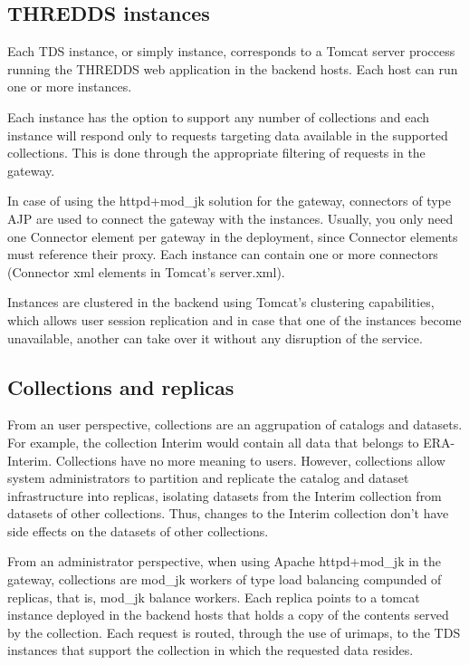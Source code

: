 \documentclass[a4paper,12pt]{article}
\begin{document}
\subsection{THREDDS instances}

Each TDS instance, or simply instance, corresponds to a Tomcat server proccess running the THREDDS web application in the backend hosts. Each host can run one or more instances. 

Each instance has the option to support any number of collections and each instance will respond only to requests targeting data available in the supported collections. This is done through the appropriate filtering of requests in the gateway.

In case of using the httpd+mod\_jk solution for the gateway, connectors of type AJP are used to connect the gateway with the instances. Usually, you only need one Connector element per gateway in the deployment, since Connector elements must reference their proxy.  Each instance can contain one or more connectors (Connector xml elements in Tomcat's server.xml).

Instances are clustered in the backend using Tomcat's clustering capabilities, which allows user session replication and in case that one of the instances become unavailable, another can take over it without any disruption of the service.

\subsection{Collections and replicas}

From an user perspective, collections are an aggrupation of catalogs and datasets. For example, the collection Interim would contain all data that belongs to ERA-Interim. Collections have no more meaning to users. However, collections allow system administrators to partition and replicate the catalog and dataset infrastructure into replicas, isolating datasets from the Interim collection from datasets of other collections. Thus, changes to the Interim collection don't have side effects on the datasets of other collections. 

From an administrator perspective, when using Apache httpd+mod\_jk in the gateway, collections are mod\_jk workers of type load balancing compunded of replicas, that is, mod\_jk balance workers. Each replica points to a tomcat instance deployed in the backend hosts that holds a copy of the contents served by the collection. Each request is routed, through the use of urimaps, to the TDS instances that support the collection in which the requested data resides.
\end{document}

